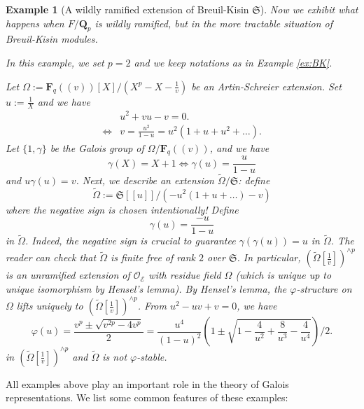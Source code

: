\documentclass[11pt]{amsart}
\newtheorem{exam}{Example}
\numberwithin{thm}{section}
\numberwithin{lem}{section}
\numberwithin{cor}{section}
\numberwithin{prop}{section}
\numberwithin{exam}{section}
\numberwithin{dfn}{section}
\newcommand{\wt}[1]{\widetilde{#1}}
\newcommand{\cO}{\mathcal{O}}
\newcommand{\fS}{\mathfrak{S}}
\newcommand{\cE}{{\mathcal{E}}}
\newcommand{\Q}{\mathbf{Q}}
\newcommand{\F}{\mathbf{F}}
\begin{document}
\begin{exam}[A wildly ramified
extension of Breuil-Kisin $\fS$]
Now we exhibit what happens when $F/\Q_p$
is wildly ramified,
but in the more tractable situation of Breuil-Kisin modules.

In this example, we set $p=2$
and we keep notations as in Example \ref{ex:BK}.

Let $\Omega:= \F_q(\!(v)\!)[X]/(X^p-X-\frac{1}{v})$
be an Artin-Schreier extension.
Set $u:=\frac{1}{X}$
and we have
\begin{align*}
&u^2+v u - v=0.
\\
\Leftrightarrow
&
v=\frac{u^2}{1-u}
=u^2(1+u+u^2+\dots).
\end{align*}
Let $\{1,\gamma\}$ be the Galois group
of $\Omega/\F_q(\!(v)\!)$,
and we have 
\[
\gamma(X)=X+1
\Leftrightarrow
\gamma(u)=\frac{u}{1-u}
\]
and $u \gamma(u)=v$.
Next, we describe an extension
$\wt \Omega/\fS$:
define
\[
\wt\Omega:=\fS[\![u]\!]/(-u^2(1+u+\dots)-v)
\]
where the negative sign is chosen intentionally!
Define
\[
\gamma(u)=\frac{-u}{1-u}
\]
in $\wt \Omega$.
Indeed, the negative sign is crucial
to guarantee $\gamma(\gamma(u))=u$
in $\wt \Omega$.
The reader can check that
$\wt\Omega$
is finite free of rank $2$ over $\fS$.
In particular,
$(\wt \Omega[\frac{1}{v}])^{\wedge p}$
is an unramified
extension of $\cO_\cE$
with residue field $\Omega$
(which is unique up to unique isomorphism
by Hensel's lemma).
By Hensel's lemma,
the $\varphi$-structure on $\Omega$
lifts uniquely to $(\wt \Omega[\frac{1}{v}])^{\wedge p}$.
From $u^2-uv+v=0$,
we have
\[
\varphi(u)=\frac{v^p\pm\sqrt{v^{2p}-4v^p}}{2}
=\frac{u^4}{(1-u)^2}(1\pm \sqrt{1-\frac{4}{u^2}+\frac{8}{u^3}-\frac{4}{u^4}})/2.
\]
in $(\wt \Omega[\frac{1}{v}])^{\wedge p}$
and $\wt \Omega$ is not $\varphi$-stable.
\end{exam}

All examples above play an important role
in the theory of Galois representations.
We list some common features of these examples:
\end{document}
